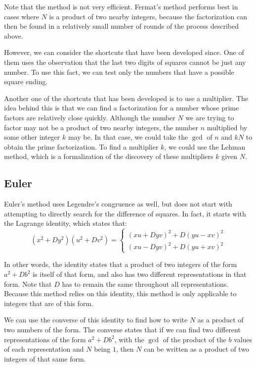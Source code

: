 \documentclass{article}
\begin{document}
\par Note that the method is not very efficient. Fermat's method performs best in cases where $N$ is a product of
two nearby integers, because the factorization can then be found in a relatively small number of rounds of the
process described above.

\par However, we can consider the shortcuts that have been developed since. One of them uses the observation that
the last two digits of squares cannot be just any number. To use this fact, we can test only the numbers that have a
possible square ending.

\par Another one of the shortcuts that has been developed is to use a multiplier. The idea behind this is that
we can find a factorization for a number whose prime factors are relatively close quickly. Although the number $N$ we
are trying to factor may not be a product of two nearby integers, the number $n$ multiplied by some other integer $k$
may be. In that case, we could take the $\gcd$ of $n$ and $kN$ to obtain the prime factorization. To find a multiplier
$k$, we could use the Lehman method, which is a formalization of the discovery of these multipliers $k$ given $N$.


\subsection{Euler}
\par Euler's method uses Legendre's congruence as well, but does not start with attempting to directly search for the
difference of squares. In fact, it starts with the Lagrange identity, which states that:
$$(x^2+Dy^2)(u^2+Dv^2) = \begin{cases} (xu+Dyv)^2 + D(yu-xv)^2 \\
    (xu - Dyv)^2 + D(yu+xv)^2 \end{cases}$$

\par In other words, the identity states that a product of two integers of the form $a^2+Db^2$ is itself of that form,
and also has two different representations in that form. Note that $D$ has to remain the same throughout all representations.
Because this method relies on this identity, this method is only applicable to integers that are of this form.

\par We can use the converse of this identity to find how to write $N$ as a product of two numbers of the form. The converse
states that if we can find two different representations of the form $a^2+Db^2$, with the $\gcd$ of the product of the $b$
values of each representation and $N$ being $1$, then $N$ can be written as a product of two integers of that same form.
\end{document}
